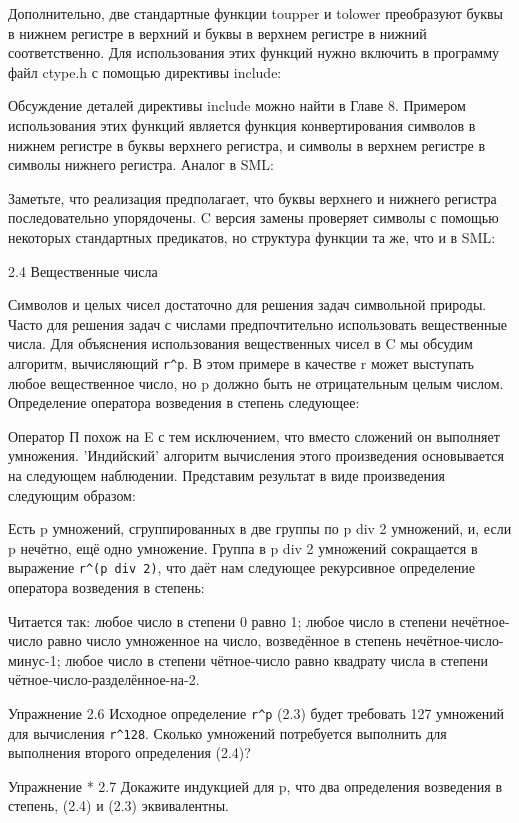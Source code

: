 Дополнительно, две стандартные функции toupper и tolower преобразуют буквы в нижнем регистре в верхний и буквы в верхнем регистре в нижний соответственно. Для использования этих функций нужно включить в программу файл ctype.h с помощью директивы include:

Обсуждение деталей директивы include можно найти в Главе 8. Примером использования этих функций является функция конвертирования символов в нижнем регистре в буквы верхнего регистра, и символы в верхнем регистре в символы нижнего регистра. Аналог в SML:

Заметьте, что реализация предполагает, что буквы верхнего и нижнего регистра последовательно упорядочены. C версия замены проверяет символы с помощью некоторых стандартных предикатов, но структура функции та же, что и в SML:

2.4 Вещественные числа

Символов и целых чисел достаточно для решения задач символьной природы. Часто для решения задач с числами предпочтительно использовать вещественные числа. Для объяснения использования вещественных чисел в C мы обсудим алгоритм, вычисляющий \lstinline|r^p|. В этом примере в качестве r может выступать любое вещественное число, но p должно быть не отрицательным целым числом. Определение оператора возведения в степень следующее:

Оператор П похож на E с тем исключением, что вместо сложений он выполняет умножения. 'Индийский' алгоритм вычисления этого произведения основывается на следующем наблюдении. Представим результат в виде произведения следующим образом:

Есть p умножений, сгруппированных в две группы по p div 2 умножений, и, если p нечётно, ещё одно умножение. Группа в p div 2 умножений сокращается в выражение \lstinline|r^(p div 2)|, что даёт нам следующее рекурсивное определение оператора возведения в степень:

Читается так: любое число в степени 0 равно 1; любое число в степени нечётное-число равно число умноженное на число, возведённое в степень нечётное-число-минус-1; любое число в степени чётное-число равно квадрату числа в степени чётное-число-разделённое-на-2.

Упражнение 2.6 Исходное определение \lstinline|r^p| (2.3) будет требовать 127 умножений для вычисления \lstinline|r^128|. Сколько умножений потребуется выполнить для выполнения второго определения (2.4)?

Упражнение * 2.7 Докажите индукцией для p, что два определения возведения в степень, (2.4) и (2.3) эквивалентны.

